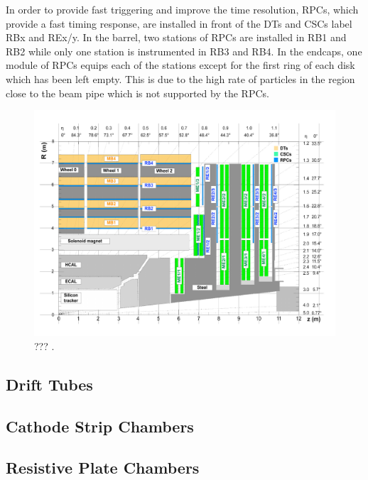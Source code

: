     In order to provide fast triggering and improve the time resolution, RPCs, which provide a fast timing response, are installed in front of the DTs and CSCs label RBx and REx/y. In the barrel, two stations of RPCs are installed in RB1 and RB2 while only one station is instrumented in RB3 and RB4. In the endcaps, one module of RPCs equips each of the stations except for the first ring of each disk which has been left empty. This is due to the high rate of particles in the region close to the beam pipe which is not supported by the RPCs.

    \begin{figure}[h!]
      \centering
      \includegraphics[width=\textwidth]{img/I-3-cms/muons.pdf}
      \caption{??? \cite{1748-0221-3-08-S08004}.}
      \label{fig:I-3-muons}
    \end{figure}

    \subsection{Drift Tubes}

  	\subsection{Cathode Strip Chambers}

  	\subsection{Resistive Plate Chambers}
